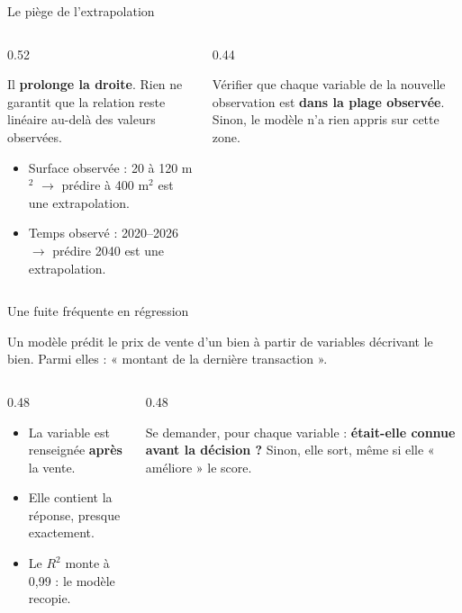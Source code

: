 \begin{frame}{Le piège de l'extrapolation}
\begin{columns}[t]
\begin{column}{0.52\textwidth}
\begin{wbox}
Il \textbf{prolonge la droite}. Rien ne garantit que la relation reste linéaire
au-delà des valeurs observées.
\end{wbox}
\begin{itemize}
  \item Surface observée : 20 à 120 m$^2$ $\rightarrow$ prédire à 400 m$^2$ est
        une extrapolation.
  \item Temps observé : 2020--2026 $\rightarrow$ prédire 2040 est une
        extrapolation.
\end{itemize}
\end{column}
\begin{column}{0.44\textwidth}
\begin{kbox}[Le réflexe]
Vérifier que chaque variable de la nouvelle observation est \textbf{dans la
plage observée}. Sinon, le modèle n'a rien appris sur cette zone.
\end{kbox}
\end{column}
\end{columns}
\end{frame}

\begin{frame}{Une fuite fréquente en régression}
\begin{wbox}[Le scénario]
Un modèle prédit le prix de vente d'un bien à partir de variables décrivant le
bien. Parmi elles : « montant de la dernière transaction ».
\end{wbox}
\begin{columns}[t]
\begin{column}{0.48\textwidth}
\begin{itemize}
  \item La variable est renseignée \textbf{après} la vente.
  \item Elle contient la réponse, presque exactement.
  \item Le $R^2$ monte à 0,99 : le modèle recopie.
\end{itemize}
\end{column}
\begin{column}{0.48\textwidth}
\begin{solbox}[La correction]
Se demander, pour chaque variable : \textbf{était-elle connue avant la
décision ?} Sinon, elle sort, même si elle « améliore » le score.
\end{solbox}
\end{column}
\end{columns}
\end{frame}

